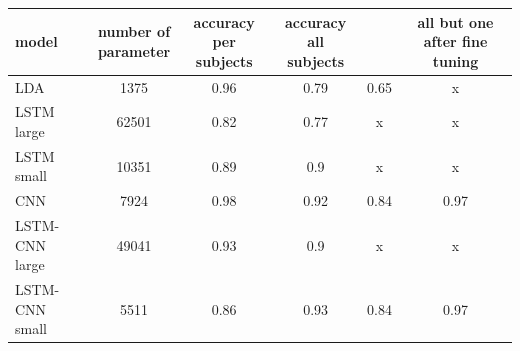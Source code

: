 \documentclass[
12pt, %
english, %
doublespacing, %
headsepline, %
]{MastersDoctoralThesis} %
\begin{document}
\vspace{0.4cm}	
\begin{table}[t]
	\label{table:AllAverageedResults}
	\centering
	\begin{tabular}{l|ccccc}
		\toprule
		model &  \makecell{number of \\parameter} &  \makecell{accuracy \\
			per subjects} & \makecell{accuracy \\
			all subjects}&\makecell{all but one}&\makecell{all but one \\ after fine tuning}\\
		\midrule
		LDA            &            1375 &                   0.96 &                  0.79 &                           0.65 &                                                 x \\
		LSTM large       &          62501 &                   0.82 &                  0.77 &                              x &                                                 x \\
		LSTM small     &           10351 &                   0.89 &                   0.9 &                              x &                                                 x \\
		CNN            &            7924 &                   0.98 &                  0.92 &                           0.84 &                                              0.97 \\
		\makecell{LSTM-CNN\\large}&           49041 &                   0.93 &                   0.9 &                              x &                                                 x \\
		\makecell{LSTM-CNN\\small}&            5511 &                   0.86 &                  0.93 &                           0.84 &                                              0.97 \\
		\bottomrule
	\end{tabular}
	
\end{table}
\end{document}
